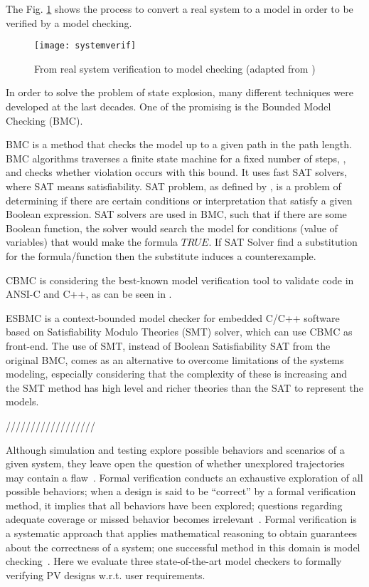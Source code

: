 The Fig. \ref{fig:systemverif} shows the process to convert a real system to a model in order to be verified by a model checking. 

\begin{figure}[h]
\texttt{[image: systemverif]}
\centering
\caption{From real system verification to model checking (adapted from \cite{Clarke2008})}
\label{fig:systemverif}
\end{figure}

In order to solve the problem of state explosion, many different techniques were developed at the last decades. One of the promising is the Bounded Model Checking (BMC). 

BMC is a method that checks the model up to a given path in the path length. BMC algorithms traverses a finite state machine for a fixed number of steps, , and checks whether violation occurs with this bound. It uses fast SAT solvers, where SAT means satisfiability. SAT problem, as defined by \cite{Clarke2008}, is a problem of determining if there are certain conditions or interpretation that satisfy a given Boolean expression. SAT solvers are used in BMC, such that if there are some Boolean function, the solver would search the model for conditions (value of variables) that would make the formula $TRUE$. If SAT Solver find a substitution for the formula/function then the substitute induces a counterexample.  

CBMC is considering the best-known model verification tool to validate code in ANSI-C and C++, as can be seen in \cite{Kroening}. 

ESBMC is a context-bounded model checker for embedded C/C++ software based on Satisfiability Modulo Theories (SMT) solver, which can use CBMC as front-end.  
The use of SMT, instead of Boolean Satisfiability SAT from the original BMC, comes as an alternative to overcome limitations of the systems modeling, especially considering that the complexity of these is increasing and the SMT method has high level and richer theories than the SAT to represent the models. 

//////////////////

Although simulation and testing explore possible behaviors and scenarios of a given system, they leave open the question of whether unexplored trajectories may contain a flaw~\cite{ClarkeHV18}. Formal verification conducts an exhaustive exploration of all possible behaviors; when a design is said to be ``correct'' by a formal verification method, it implies that all behaviors have been explored; questions regarding adequate coverage or missed behavior becomes irrelevant~\cite{Clarke2012}. Formal verification is a systematic approach that applies mathematical reasoning to obtain guarantees about the correctness of a system; one successful method in this domain is model checking~\cite{Clarke2012}. Here we evaluate three state-of-the-art model checkers to formally verifying PV designs w.r.t. user requirements.

